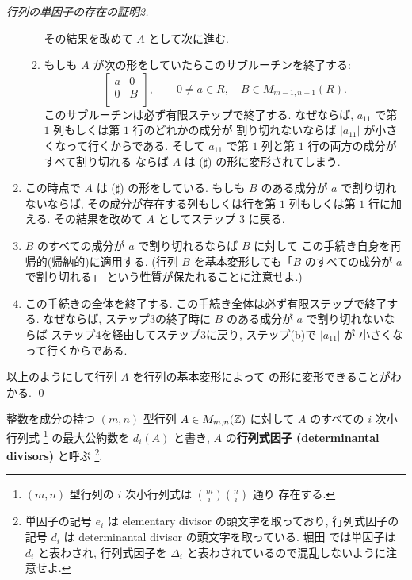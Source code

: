 \documentclass[12pt,twoside]{jarticle}
\begin{document}
\begin{proof}[行列の単因子の存在の証明2]
\begin{enumerate}
\begin{enumerate}
    その結果を改めて $A$ として次に進む.
  \item もしも $A$ が次の形をしていたらこのサブルーチンを終了する:
    \begin{equation*}
      \begin{bmatrix}
        a & 0 \\
        0 & B \\
      \end{bmatrix},
    \qquad
    0\ne a\in R,\quad
    B\in M_{m-1,n-1}(R).
    \tag{$\sharp$}
    \end{equation*}
    このサブルーチンは必ず有限ステップで終了する. 
    なぜならば, $a_{11}$ で第 $1$ 列もしくは第 $1$ 行のどれかの成分が
    割り切れないならば $|a_{11}|$ が小さくなって行くからである.
    そして $a_{11}$ で第 $1$ 列と第 $1$ 行の両方の成分がすべて割り切れる
    ならば $A$ は ($\sharp$) の形に変形されてしまう.
  \end{enumerate}
\item この時点で $A$ は ($\sharp$) の形をしている.  
  もしも $B$ のある成分が $a$ で割り切れないならば, 
  その成分が存在する列もしくは行を第 $1$ 列もしくは第 $1$ 行に加える.
  その結果を改めて $A$ としてステップ 3 に戻る.
\item $B$ のすべての成分が $a$ で割り切れるならば $B$ に対して
  この手続き自身を再帰的(帰納的)に適用する.  
  (行列 $B$ を基本変形しても「$B$ のすべての成分が $a$ で割り切れる」
  という性質が保たれることに注意せよ.)
\item この手続きの全体を終了する.
  この手続き全体は必ず有限ステップで終了する.
  なぜならば, ステップ3の終了時に $B$ のある成分が $a$ で割り切れないならば
  ステップ4を経由してステップ3に戻り, ステップ(b)で $|a_{11}|$ が
  小さくなって行くからである.
\end{enumerate}
以上のようにして行列 $A$ を行列の基本変形によって
の形に変形できることがわかる.
\qed
\end{proof}

\medskip
\noindent

整数を成分の持つ $(m,n)$ 型行列 $A\in M_{m,n}({\mathbb Z})$ に対して %
$A$ のすべての $i$ 次小行列式%
\footnote{$(m,n)$ 型行列の $i$ 次小行列式は $\binom{m}{i}\binom{n}{i}$ 通り
  存在する.}%
の最大公約数を $d_i(A)$ と書き, $A$ の{\bf 行列式因子 (determinantal
divisors)} と呼ぶ%
\footnote{単因子の記号 $e_i$ は elementary divisor の頭文字を取っており,
  行列式因子の記号 $d_i$ は determinantal divisor の頭文字を取っている.
  堀田 \cite{gun-kagun} では単因子は $d_i$ と表わされ, 
  行列式因子を $\varDelta_i$ と表わされているので混乱しないように注意せよ.}.
\end{document}
